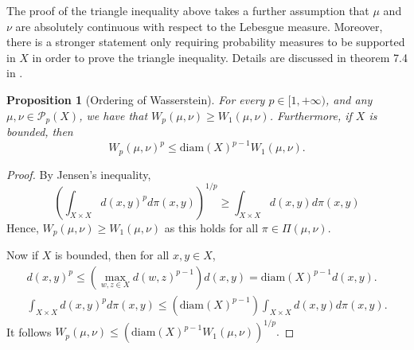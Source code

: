 \documentclass[12pt]{article}
\theoremstyle{plain}
\newtheorem{prop}{Proposition}[section]
\numberwithin{equation}{section}
\begin{document}
The proof of the triangle inequality above takes a further assumption that $\mu$ and $\nu$ are absolutely continuous with respect to the Lebesgue measure. Moreover, there is a stronger statement only requiring probability measures to be supported in $X$ in order to prove the triangle inequality. Details are discussed in theorem 7.4 in \cite{villani}.
\begin{prop}[Ordering of Wasserstein]
  For every $p\in [1,+\infty)$, and any $\mu,\nu\in \mathcal{P}_p(X)$, we have that $W_p(\mu,\nu) \ge W_1(\mu,\nu)$. Furthermore, if $X$ is bounded, then \[W_p(\mu,\nu)^p \le \text{diam}(X)^{p-1}W_1(\mu,\nu).\]
\end{prop}
\begin{proof}
  By Jensen's inequality,
  \begin{equation*}
    \left(\int_{X\times X} d(x,y)^pd\pi(x,y)\right)^{1/p} \ge \int_{X\times X} d(x,y)d\pi(x,y)
  \end{equation*}
  Hence, $W_p(\mu,\nu) \ge W_1(\mu,\nu)$ as this holds for all $\pi\in \Pi(\mu,\nu)$.

  Now if $X$ is bounded, then for all $x,y\in X$,
  \begin{align*}
    d(x,y)^p \le (\max_{w,z\in X} d(w,z)^{p-1})d(x,y) = \text{diam}(X)^{p-1}d(x,y). \\
    \int_{X\times X} d(x,y)^pd\pi(x,y)\le (\text{diam}(X)^{p-1})\int_{X\times X}d(x,y)d\pi(x,y).
  \end{align*}
  It follows $W_p(\mu,\nu) \le \left(\text{diam}(X)^{p-1}W_1(\mu,\nu)\right)^{1/p}.$
\end{proof}
\end{document}
